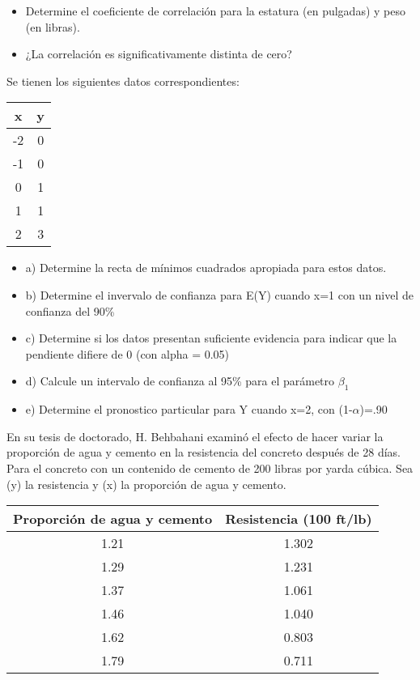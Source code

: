 \documentclass{../oxmathproblems}
\begin{document}
\begin{questions}
\begin{itemize}
  \item Determine el coeficiente de correlación para la estatura (en pulgadas) y peso (en libras). 
  \item ¿La correlación es significativamente distinta de cero?
\end{itemize}

\miquestion Se tienen los siguientes datos correspondientes: 

\begin{tabular}{|c|c|}
\hline
x & y \\ \hline
-2 & 0\\
-1 & 0\\
0 & 1\\ 
1& 1\\ 
2 & 3\\ 
\hline
\end{tabular}

\begin{itemize}
  \item a) Determine la recta de mínimos cuadrados apropiada para estos datos. 
  \item b) Determine el invervalo de confianza para E(Y) cuando x=1 con un nivel de confianza del 90\%
  \item c) Determine si los datos presentan suficiente evidencia para indicar que la pendiente difiere de 0 (con alpha = 0.05)
  \item d) Calcule un intervalo de confianza al 95\% para el parámetro  $\beta_1$
  \item e) Determine el pronostico particular para Y cuando x=2, con  (1-$\alpha$)=.90
\end{itemize}


\miquestion  En su tesis de doctorado, H. Behbahani examinó el efecto de hacer variar la proporción de agua y cemento en la resistencia del concreto después de 28 días. Para el concreto con un contenido de cemento de 200 libras por yarda cúbica. Sea (y) la resistencia y (x) la proporción de agua y cemento. 


\begin{tabular}{|c|c|}
\hline
Proporción de agua y cemento & Resistencia (100 ft/lb) \\ \hline
1.21 & 1.302\\
1.29 & 1.231\\
1.37 & 1.061\\ 
1.46 & 1.040\\ 
1.62 & 0.803\\ 
1.79 & 0.711\\ 
\hline
\end{tabular}


\end{questions}
\end{document}
